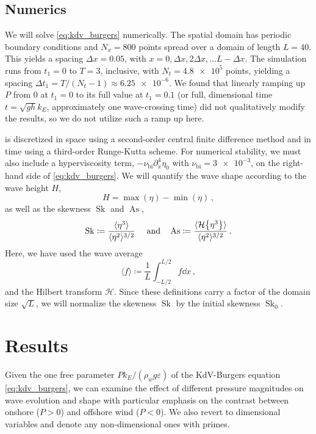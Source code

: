 \documentclass{jfm}
\DeclareMathOperator{\Sk}{Sk}
\DeclareMathOperator{\As}{As}
\newcommand{\hilbert}{\mathcal{H}}
\renewcommand*{\epsilon}{\varepsilon}
\begin{document}
\subsection{Numerics}
We will solve \cref{eq:kdv_burgers} numerically.
The spatial domain has periodic boundary conditions and $N_x = 800$
points spread over a domain of length $L = 40$.
This yields a spacing $\Delta x = 0.05$, with $x = 0, \Delta x,
2\Delta x, \ldots L - \Delta x$.
The simulation runs from $t_1 = 0$ to $T = 3$, inclusive, with
$N_t = \num{4.8e5}$ points, yielding a spacing $\Delta t_1 = T/(N_t-1)
\approx \num{6.25e-6}$.
We found that linearly ramping up $P$ from $0$ at $t_1=0$ to its full
value at $t_1 = 0.1$ (or full, dimensional time $t = \sqrt{gh} k_E$,
\ie{} approximately one wave-crossing time) did not qualitatively modify
the results, so we do not utilize such a ramp up here.

 is discretized in space using a
second-order central finite difference method and in time using a
third-order Runge-Kutta scheme.
For numerical stability, we must also include a hyperviscosity term,
$-\nu_{\text{bi}} \partial_x^4 \eta_0$ with $\nu_{\text{bi}} =
\num{3e-3}$, on the right-hand side of \cref{eq:kdv_burgers}.
We will quantify the wave shape according to the wave height $H$,
\begin{equation}
  H = \max(\eta) - \min(\eta) \,,
  \label{eq:height_def}
\end{equation}
as well as the skewness $\Sk$ and $\As$,
\begin{equation}
  \Sk \coloneqq \frac{\langle \eta^3 \rangle}{\langle \eta^2
  \rangle^{3/2}} \
  \qq{and}
  \As \coloneqq \frac{\langle \hilbert \Bqty{\eta^3} \rangle}{\langle
    \eta^2 \rangle^{3/2}} \,.
  \label{eq:shape_stats_def}
\end{equation}
Here, we have used the wave average
\begin{equation}
  \langle f \rangle \coloneqq \frac{1}{L} \int_{-L/2}^{L/2} f
  \dd{x} \,,
\end{equation}
and the Hilbert transform $\hilbert$.
Since these definitions carry a factor of the domain size $\sqrt{L}$,
we will normalize the skewness $\Sk$ by the initial skewness $\Sk_0$.

\section{\label{sec:results} Results}
Given the one free parameter $P k_E/(\rho_w g \epsilon)$ of the
KdV-Burgers equation \cref{eq:kdv_burgers}, we can examine the effect of
different pressure magnitudes on wave evolution and shape with
particular emphasis on the contrast between onshore ($P > 0$) and
offshore wind ($P < 0$).
We also revert to dimensional variables and denote any
non-dimensional ones with primes.
\end{document}
